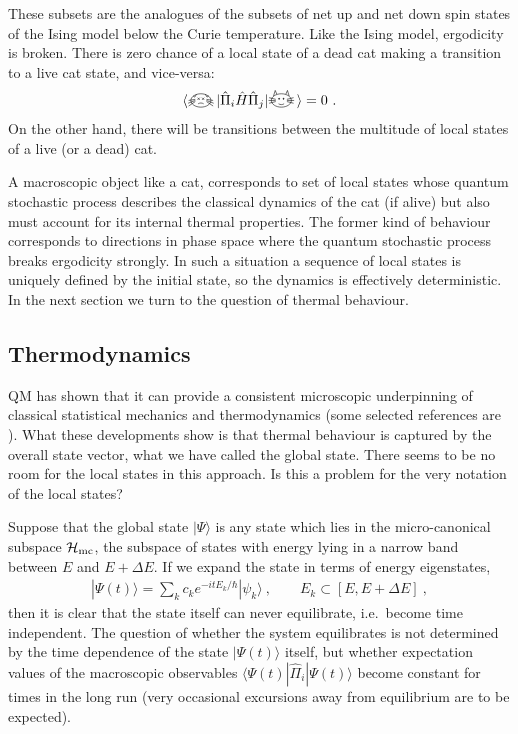 \documentclass[12pt]{article}
\theoremstyle{plain}
\theoremstyle{definition}
\theoremstyle{remark}
\def\BH{{\cal H}}
\def\bra#1{\langle #1|}
\def\ket#1{| #1\rangle}
\def\LCATH{\raisebox{-2pt}{\begin{tikzpicture}[scale=0.14]
\draw (0,0) ellipse (1.8cm and 1.2cm);
\draw [-] (1,0) -- (2.3,0);
\draw [-] (-1,0) -- (-2.3,0);
\draw [-] (1,-0.2) -- (2.2,-0.5);
\draw [-] (-1,-0.2) -- (-2.2,-0.5);
\draw [-] (1,0.2) -- (2.2,0.5);
\draw [-] (-1,0.2) -- (-2.2,0.5);
\filldraw[black] (0.4,0.3) circle (0.1cm);
\filldraw[black] (-0.4,0.3) circle (0.1cm);
\draw[-] (-0.5,-0.6) to[out=-30,in=210] (0.5,-0.6);
\draw[-] (0.8,1.1) -- (1.1,1.8) -- (1.4,0.8);
\draw[-] (-0.8,1.1) -- (-1.1,1.8) -- (-1.4,0.8);
\end{tikzpicture}
}\!}
\def\DCATH{\raisebox{-2pt}{\begin{tikzpicture}[scale=0.14]
\draw (0,0) ellipse (1.8cm and 1.2cm);
\draw [-] (1,0) -- (2.3,-0.5);
\draw [-] (-1,0) -- (-2.3,-0.5);
\draw [-] (1,-0.2) -- (2.2,-1);
\draw [-] (-1,-0.2) -- (-2.2,-1);
\draw [-] (1,0.2) -- (2.2,0);
\draw [-] (-1,0.2) -- (-2.2,0);
\draw[-] (0.2,0.1) -- (0.6,0.5);
\draw[-] (0.2,0.5) -- (0.6,0.1);
\draw[-] (-0.2,0.1) -- (-0.6,0.5);
\draw[-] (-0.2,0.5) -- (-0.6,0.1);
\draw[-]  (-0.5,-0.6) to[out=30,in=150] (0.5,-0.6);
\draw[-] (0.8,1.1) -- (1.1,0.6) -- (1.4,0.8);
\draw[-] (-0.8,1.1) -- (-1.1,0.6) -- (-1.4,0.8);
\end{tikzpicture}
}\!}
\newcommand{\EQ}[1]{\begin{equation}\begin{split} #1
\end{split}\end{equation}}
\begin{document}
These subsets are the analogues of the subsets of net up and net down spin states of the Ising model below the Curie temperature. Like the Ising model, ergodicity is broken. There is zero chance of a local state of a dead cat making a transition to a live cat state, and vice-versa:
\EQ{
\bra{\DCATH}\hat\Pi_i\hat H\hat\Pi_j\ket{\LCATH}=0\ .
}
On the other hand, there will be transitions between the multitude of local states of a live (or a dead) cat.

A macroscopic object like a cat, corresponds to set of local states whose quantum stochastic process describes the classical dynamics of the cat (if alive) but also must account for its internal thermal properties.
The former kind of behaviour corresponds to directions in phase space where the quantum stochastic process breaks ergodicity strongly. In such a situation a sequence of local states is uniquely defined by the initial state, so the dynamics is effectively deterministic. In the next section we turn to the question of thermal behaviour.

\subsection{Thermodynamics}\label{s8.2}

QM has shown that it can provide a consistent microscopic underpinning of classical statistical mechanics and thermodynamics (some selected references are \cite{PopescuShortWinter:2006efsm,GoldsteinLebowitzTumulkaZanghi:2006ct,GMM,Reimann1,Srednicki2}). What these developments show is that thermal behaviour is captured by the overall state vector, what we have called the global state. There seems to be no room for the local states in this approach. Is this a problem for the very notation of the local states?

Suppose that the global state $\ket{\Psi}$ is any state which lies in the micro-canonical subspace $\BH_\text{mc}$, the subspace of states with energy lying in a narrow band between $E$ and $E+\Delta E$. If we expand the state in terms of energy eigenstates, 
\EQ{
\ket{\Psi(t)}=\sum_kc_ke^{-itE_k/\hbar}\ket{\psi_k}\ ,\qquad E_k\subset[E,E+\Delta E]\ ,
}
then it is clear that the state itself can never equilibrate, i.e.~become time independent. 
The question of whether the system equilibrates is not determined by the time dependence of the state $\ket{\Psi(t)}$ itself, but whether expectation values of the macroscopic observables $\bra{\Psi(t)}\hat\Pi_i\ket{\Psi(t)}$ 
become constant for times in the long run (very occasional excursions away from equilibrium are to be expected). 
\end{document}
